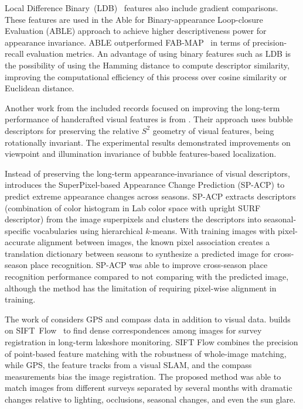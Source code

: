 Local Difference Binary~(LDB)~\parencite{original:ldb} features also include gradient comparisons. These features are used in the Able for Binary-appearance Loop-closure Evaluation (ABLE) \parencite{arroyo-et-al:2018:7} approach to achieve higher descriptiveness power for appearance invariance.
ABLE outperformed FAB-MAP~\parencite{discussion:fab-map} in terms of precision-recall evaluation metrics. An advantage of using binary features such as LDB is the possibility of using the Hamming distance to compute descriptor similarity, improving the computational efficiency of this process over cosine similarity or Euclidean distance.

Another work from the included records focused on improving the long-term performance of handcrafted visual features is from \cite{karaoguz-bozma:2016:4}. Their approach uses bubble descriptors for preserving the relative $S^2$ geometry of visual features, being rotationally invariant. The experimental results demonstrated improvements on viewpoint and illumination invariance of bubble features-based localization.

Instead of preserving the long-term appearance-invariance of visual descriptors, \cite{neubert-et-al:2015:005} introduces the SuperPixel-based Appearance Change Prediction (SP-ACP) to predict extreme appearance changes across seasons.
SP-ACP extracts descriptors (combination of color histogram in Lab color space with upright SURF descriptor) from the image superpixels and clusters the descriptors into seasonal-specific vocabularies using hierarchical $k$-means.
With training images with pixel-accurate alignment between images, the known pixel association creates a translation dictionary between seasons to synthesize a predicted image for cross-season place recognition.
SP-ACP was able to improve cross-season place recognition performance compared to not comparing with the predicted image, although the method has the limitation of requiring pixel-wise alignment in training.

The work of \cite{griffith-pradalier:2017:21664} considers GPS and compass data in addition to visual data. \cite{griffith-pradalier:2017:21664} builds on SIFT~Flow~\parencite{original:sift-flow} to find dense correspondences among images for survey registration in long-term lakeshore monitoring. SIFT Flow combines the precision of point-based feature matching with the robustness of whole-image matching, while GPS, the feature tracks from a visual SLAM, and the compass measurements bias the image registration. The proposed method was able to match images from different surveys separated by several months with dramatic changes relative to lighting, occlusions, seasonal changes, and even the sun glare.

